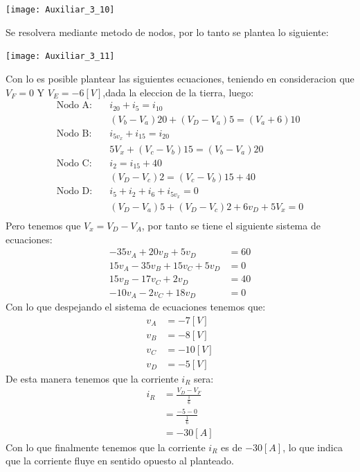\documentclass[
  11pt,
  letterpaper,
   addpoints,
   answers
  ]{exam}
\begin{document}
\begin{questions}
    \begin{center}
        \texttt{[image: Auxiliar\_3\_10]}
    \end{center}
    \begin{solution}
        Se resolvera mediante metodo de nodos, por lo tanto se plantea lo siguiente:
        \begin{center}
            \texttt{[image: Auxiliar\_3\_11]}
        \end{center}
        Con lo es posible plantear las siguientes ecuaciones, teniendo en consideracion que $V_{F} = 0$ Y $V_{E}= -6[V]$,dada la eleccion de la tierra, luego:
        \begin{align}
            \text{Nodo A:} \quad & i_{20} + i_{5} = i_{10}\\
            & (V_{b} - V_{a})20 + (V_{D} - V_{a})5 = (V_{a} + 6)10\\
            \text{Nodo B:} \quad & i_{5v_{x}} + i_{15} = i_{20}\\
            & 5V_{x} + (V_{c} - V_{b})15 = (V_{b} - V_{a})20\\
            \text{Nodo C:} \quad & i_{2} =i_{15} + 40\\
            & (V_{D} - V_{c})2 = (V_{c} - V_{b})15 + 40\\
            \text{Nodo D:} \quad & i_{5} + i_{2} +i_{6} +i_{5v_{x}} = 0\\
            & (V_{D} - V_{a})5 + (V_{D} - V_{c})2 + 6v_{D} + 5V_{x} = 0\\
        \end{align}
        Pero tenemos que $V_{x} = V_{D} - V_{A}$, por tanto se tiene el siguiente sistema de ecuaciones:
        \begin{align}
            -35v_A + 20v_B + 5v_D &= 60 \\
            15v_A - 35v_B + 15v_C + 5v_D &= 0 \\
            15v_B - 17v_C + 2v_D &= 40 \\
            -10v_A - 2v_C + 18v_D &= 0
        \end{align}
        Con lo que despejando el sistema de ecuaciones tenemos que:
        \begin{align}
            v_A &= -7[V] \\
            v_B &= -8[V] \\
            v_C &= -10[V] \\
            v_D &= -5[V]
        \end{align}
        De esta manera tenemos que la corriente $i_R$ sera:
        \begin{align}
            i_R &= \frac{V_{D} - V_{F}}{\frac{1}{6}} \\
            &= \frac{-5 - 0}{\frac{1}{6}} \\
            &= -30[A]
        \end{align}
        Con lo que finalmente tenemos que la corriente $i_R$ es de $-30[A]$, lo que indica que la corriente fluye en sentido opuesto al planteado.
    \end{solution}


\end{questions}
\end{document}
